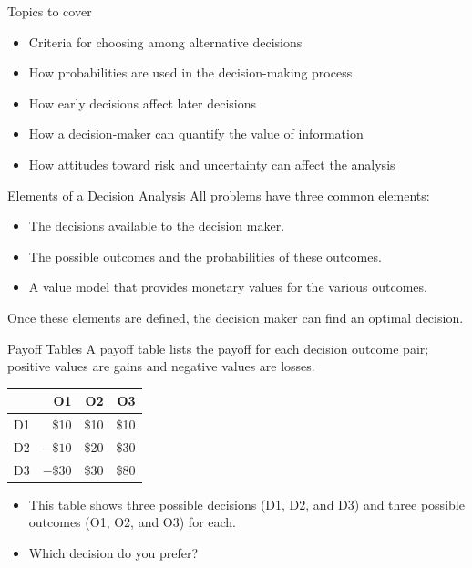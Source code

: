 \documentclass{beamer}\usepackage[]{graphicx}\usepackage[]{color}
\begin{document}
\begin{darkframes}
    \begin{frame}[fragile]{Topics to cover}
          \begin{itemize}[<+->]
            \item Criteria for choosing among alternative decisions
            \item How probabilities are used in the decision-making process
            \item How early decisions affect later decisions
            \item How a decision-maker can quantify the value of information
            \item How attitudes toward risk and uncertainty can affect the analysis
          \end{itemize}

    \end{frame}


    \begin{frame}[fragile]{Elements of a Decision Analysis}
      All problems have three common elements:

        \begin{itemize}
            \item The decisions available to the decision maker.
            \item The possible outcomes and the probabilities of these outcomes.
            \item A value model that provides monetary values for the various outcomes.
        \end{itemize}

      Once these elements are defined, the decision maker can find an optimal decision.
    \end{frame}


    \begin{frame}[fragile]{Payoff Tables}
      A payoff table lists the payoff for each decision outcome pair; positive values are gains and negative values are losses.

        \begin{center}
          \begin{tabular}{r|rrr}
            & O1 & O2 & O3 \\
            \hline
            D1 & \$10 & \$10 & \$10 \\
            D2 & $-\$10$ & \$20 & \$30 \\
            D3 & $-\$30$ & \$30 & \$80
          \end{tabular}
        \end{center}
        \begin{itemize}
            \item This table shows three possible decisions (D1, D2, and D3) and three
            possible outcomes (O1, O2, and O3) for each.
            \item Which decision do you prefer?
        \end{itemize}


\end{frame}
\end{darkframes}
\end{document}
